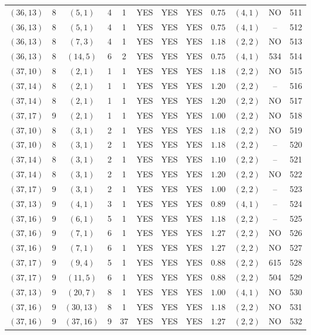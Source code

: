 \begin{longtable}{|c|c|c|c|c|c|c|c|c|c|c|c|}
$(36,13)$ & 8 & $(5,1)$ & 4 & 1 & YES & YES & YES & $0.75$ & $(4,1)$ & NO & 511\\
$(36,13)$ & 8 & $(5,1)$ & 4 & 1 & YES & YES & YES & $0.75$ & $(4,1)$ & -- & 512\\
$(36,13)$ & 8 & $(7,3)$ & 4 & 1 & YES & YES & YES & $1.18$ & $(2,2)$ & NO & 513\\
$(36,13)$ & 8 & $(14,5)$ & 6 & 2 & YES & YES & YES & $0.75$ & $(4,1)$ & 534 & 514\\
$(37,10)$ & 8 & $(2,1)$ & 1 & 1 & YES & YES & YES & $1.18$ & $(2,2)$ & NO & 515\\
$(37,14)$ & 8 & $(2,1)$ & 1 & 1 & YES & YES & YES & $1.20$ & $(2,2)$ & -- & 516\\
$(37,14)$ & 8 & $(2,1)$ & 1 & 1 & YES & YES & YES & $1.20$ & $(2,2)$ & NO & 517\\
$(37,17)$ & 9 & $(2,1)$ & 1 & 1 & YES & YES & YES & $1.00$ & $(2,2)$ & NO & 518\\
$(37,10)$ & 8 & $(3,1)$ & 2 & 1 & YES & YES & YES & $1.18$ & $(2,2)$ & NO & 519\\
$(37,10)$ & 8 & $(3,1)$ & 2 & 1 & YES & YES & YES & $1.18$ & $(2,2)$ & -- & 520\\
$(37,14)$ & 8 & $(3,1)$ & 2 & 1 & YES & YES & YES & $1.10$ & $(2,2)$ & -- & 521\\
$(37,14)$ & 8 & $(3,1)$ & 2 & 1 & YES & YES & YES & $1.20$ & $(2,2)$ & NO & 522\\
$(37,17)$ & 9 & $(3,1)$ & 2 & 1 & YES & YES & YES & $1.00$ & $(2,2)$ & -- & 523\\
$(37,13)$ & 9 & $(4,1)$ & 3 & 1 & YES & YES & YES & $0.89$ & $(4,1)$ & -- & 524\\
$(37,16)$ & 9 & $(6,1)$ & 5 & 1 & YES & YES & YES & $1.18$ & $(2,2)$ & -- & 525\\
$(37,16)$ & 9 & $(7,1)$ & 6 & 1 & YES & YES & YES & $1.27$ & $(2,2)$ & NO & 526\\
$(37,16)$ & 9 & $(7,1)$ & 6 & 1 & YES & YES & YES & $1.27$ & $(2,2)$ & NO & 527\\
$(37,17)$ & 9 & $(9,4)$ & 5 & 1 & YES & YES & YES & $0.88$ & $(2,2)$ & 615 & 528\\
$(37,17)$ & 9 & $(11,5)$ & 6 & 1 & YES & YES & YES & $0.88$ & $(2,2)$ & 504 & 529\\
$(37,13)$ & 9 & $(20,7)$ & 8 & 1 & YES & YES & YES & $1.00$ & $(4,1)$ & NO & 530\\
$(37,16)$ & 9 & $(30,13)$ & 8 & 1 & YES & YES & YES & $1.18$ & $(2,2)$ & NO & 531\\
$(37,16)$ & 9 & $(37,16)$ & 9 & 37 & YES & YES & YES & $1.27$ & $(2,2)$ & NO & 532\\

\end{longtable}
